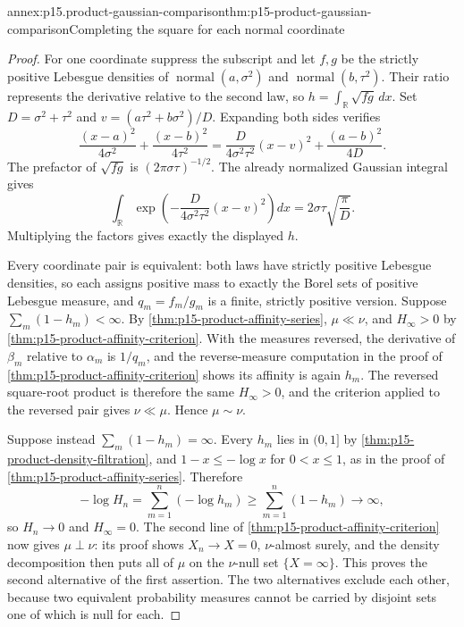\begin{annexitem}{annex:p15.product-gaussian-comparison}{thm:p15-product-gaussian-comparison}{Completing the square for each normal coordinate}
\begin{proof}
For one coordinate suppress the subscript and let \(f,g\) be the
strictly positive Lebesgue densities of
\(\operatorname{normal}(a,\sigma^2)\) and
\(\operatorname{normal}(b,\tau^2)\).
Their ratio represents the derivative relative to the second law,
so \(h=\int_{\mathbb R}\sqrt{fg}\,dx\).
Set \(D=\sigma^2+\tau^2\) and
\(v=(a\tau^2+b\sigma^2)/D\).
Expanding both sides verifies
\[
 \frac{(x-a)^2}{4\sigma^2}+\frac{(x-b)^2}{4\tau^2}
 =\frac{D}{4\sigma^2\tau^2}(x-v)^2+\frac{(a-b)^2}{4D}.
\]
The prefactor of \(\sqrt{fg}\) is
\((2\pi\sigma\tau)^{-1/2}\).
The already normalized Gaussian integral gives
\[
 \int_{\mathbb R}
       \exp\!\left(-\frac{D}{4\sigma^2\tau^2}(x-v)^2\right)dx
                =2\sigma\tau\sqrt{\frac{\pi}{D}}.
\]
Multiplying the factors gives exactly the displayed \(h\).

Every coordinate pair is equivalent: both laws have strictly positive
Lebesgue densities, so each assigns positive mass to exactly the Borel
sets of positive Lebesgue measure, and \(q_m=f_m/g_m\) is a finite,
strictly positive version.
Suppose \(\sum_m(1-h_m)<\infty\). By
\cref{thm:p15-product-affinity-series}, \(\mu\ll\nu\), and \(H_\infty>0\)
by \cref{thm:p15-product-affinity-criterion}. With the measures
reversed, the derivative of \(\beta_m\) relative to \(\alpha_m\) is
\(1/q_m\), and the reverse-measure computation in the proof of
\cref{thm:p15-product-affinity-criterion} shows its affinity is again
\(h_m\). The reversed square-root product is therefore the same
\(H_\infty>0\), and the criterion applied to the reversed pair gives
\(\nu\ll\mu\). Hence \(\mu\sim\nu\).

Suppose instead \(\sum_m(1-h_m)=\infty\). Every \(h_m\) lies in
\((0,1]\) by \cref{thm:p15-product-density-filtration}, and
\(1-x\leq-\log x\) for \(0<x\leq1\), as in the proof of
\cref{thm:p15-product-affinity-series}. Therefore
\[
 -\log H_n=\sum_{m=1}^n(-\log h_m)
          \geq\sum_{m=1}^n(1-h_m)\longrightarrow\infty,
\]
so \(H_n\to0\) and \(H_\infty=0\). The second line of
\cref{thm:p15-product-affinity-criterion} now gives \(\mu\perp\nu\):
its proof shows \(X_n\to X=0\), \(\nu\)-almost surely, and the density
decomposition then puts all of \(\mu\) on the \(\nu\)-null set
\(\{X=\infty\}\). This proves the second alternative of the first
assertion. The two alternatives exclude each other, because two
equivalent probability measures cannot be carried by disjoint sets one
of which is null for each.


\end{proof}
\end{annexitem}
